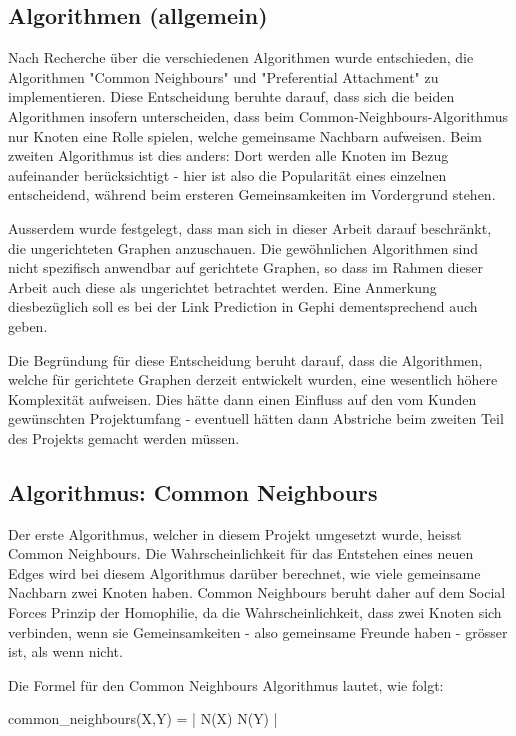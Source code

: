 \subsection{Algorithmen (allgemein)}

Nach Recherche über die verschiedenen Algorithmen wurde entschieden, die Algorithmen "Common Neighbours" und
"Preferential Attachment" zu implementieren. Diese Entscheidung beruhte darauf, dass sich die beiden Algorithmen
insofern unterscheiden, dass beim Common-Neighbours-Algorithmus nur Knoten eine Rolle spielen, welche gemeinsame
Nachbarn aufweisen. Beim zweiten Algorithmus ist dies anders: Dort werden alle Knoten im Bezug aufeinander
berücksichtigt - hier ist also die Popularität eines einzelnen entscheidend, während beim ersteren Gemeinsamkeiten im
Vordergrund stehen.

Ausserdem wurde festgelegt, dass man sich in dieser Arbeit darauf beschränkt, die ungerichteten Graphen anzuschauen.
Die gewöhnlichen Algorithmen sind nicht spezifisch anwendbar auf gerichtete Graphen, so dass im Rahmen dieser Arbeit
auch diese als ungerichtet betrachtet werden. Eine Anmerkung diesbezüglich soll es bei der Link Prediction in Gephi
dementsprechend auch geben.

Die Begründung für diese Entscheidung beruht darauf, dass die Algorithmen, welche für gerichtete Graphen derzeit
entwickelt wurden, eine wesentlich höhere Komplexität aufweisen. Dies hätte dann einen Einfluss auf den vom Kunden
gewünschten Projektumfang - eventuell hätten dann Abstriche beim zweiten Teil des Projekts gemacht werden müssen.

\subsection{Algorithmus: Common Neighbours}

Der erste Algorithmus, welcher in diesem Projekt umgesetzt wurde, heisst Common Neighbours. Die Wahrscheinlichkeit
für das Entstehen eines neuen Edges wird bei diesem Algorithmus darüber berechnet, wie viele gemeinsame Nachbarn zwei
Knoten haben. Common Neighbours beruht daher auf dem Social Forces Prinzip der Homophilie, da die Wahrscheinlichkeit,
dass zwei Knoten sich verbinden, wenn sie Gemeinsamkeiten - also gemeinsame Freunde haben - grösser ist, als wenn nicht.

Die Formel für den Common Neighbours Algorithmus lautet, wie folgt:

common_neighbours(X,Y) = | N(X) \cap N(Y) |

